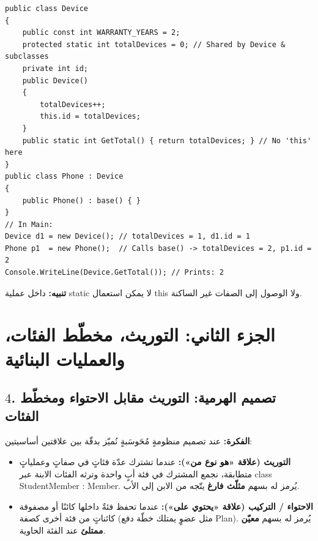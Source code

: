 \documentclass[14pt]{extarticle}
\begin{document}
\begin{boxCode}
\begin{english}
\begin{verbatim}
public class Device
{
    public const int WARRANTY_YEARS = 2;
    protected static int totalDevices = 0; // Shared by Device & subclasses
    private int id;
    public Device()
    {
        totalDevices++;
        this.id = totalDevices;
    }
    public static int GetTotal() { return totalDevices; } // No 'this' here
}
public class Phone : Device
{
    public Phone() : base() { }
}
// In Main:
Device d1 = new Device(); // totalDevices = 1, d1.id = 1
Phone p1  = new Phone();  // Calls base() -> totalDevices = 2, p1.id = 2
Console.WriteLine(Device.GetTotal()); // Prints: 2
\end{verbatim}
\end{english}
\end{boxCode}

\textbf{تنبيه:} داخل عملية \textenglish{static} لا يمكن استعمال \textenglish{this} ولا الوصول إلى الصفات غير الساكنة.

\clearpage
\section*{الجزء الثاني: التوريث، مخطّط الفئات، والعمليات البنائية}

\subsection*{$4$. تصميم الهرمية: التوريث مقابل الاحتواء ومخطّط الفئات}
\textbf{الفكرة:} عند تصميم منظومةٍ مُحَوسَبةٍ نُميّز بدقّة بين علاقتين أساسيتين:
\begin{itemize}
    \item \textbf{التوريث (علاقة «هو نوع من»):} عندما تشترك عدّة فئاتٍ في صفاتٍ وعملياتٍ متطابقة، نجمع المشترك في فئة أبٍ واحدة وترثه الفئات الابنة عبر \textenglish{class StudentMember : Member}. يُرمز له بسهم \textbf{مثلّث فارغ} يتّجه من الابن إلى الأب.
    \item \textbf{الاحتواء / التركيب (علاقة «يحتوي على»):} عندما تحفظ فئةٌ داخلها كائنًا أو مصفوفة كائناتٍ من فئة أخرى كصفة (مثل عضوٍ يمتلك خطّة دفع \textenglish{Plan}). يُرمز له بسهم \textbf{معيّن ممتلئ} عند الفئة الحاوية.
\end{itemize}
\end{document}
